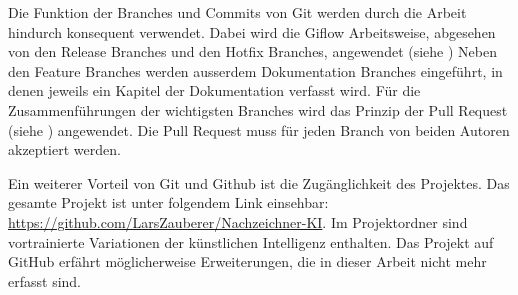 Die Funktion der Branches und Commits von Git werden durch die Arbeit hindurch
konsequent verwendet. Dabei wird die Giflow Arbeitsweise, abgesehen von den
Release Branches und den Hotfix Branches, angewendet (siehe
) Neben den Feature Branches werden ausserdem
Dokumentation Branches eingeführt, in denen jeweils ein Kapitel der
Dokumentation verfasst wird. Für die Zusammenführungen der wichtigsten Branches
wird das Prinzip der Pull Request (siehe ) angewendet. Die
Pull Request muss für jeden Branch von beiden Autoren akzeptiert werden.

Ein weiterer Vorteil von Git und Github ist die Zugänglichkeit des Projektes.
Das gesamte Projekt ist unter folgendem Link einsehbar:
\url{https://github.com/LarsZauberer/Nachzeichner-KI}. Im Projektordner sind
vortrainierte Variationen der künstlichen Intelligenz enthalten. Das Projekt auf
GitHub erfährt möglicherweise Erweiterungen, die in dieser Arbeit nicht mehr
erfasst sind.

